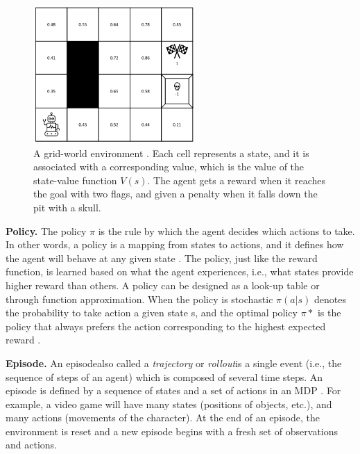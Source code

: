 \begin{figure}[!ht]
    \centering
    \includegraphics[width=0.55\textwidth]{images/gridworld.png}
    \caption{A grid-world environment \cite{eriksson2021deep}. Each cell represents a state, and it is associated with a corresponding value, which is the value of the state-value function $V(s)$. The agent gets a reward when it reaches the goal with two flags, and given a penalty when it falls down the pit with a skull.
    }
    \label{fig:gridworld}
\end{figure}



\textbf{Policy.}
The policy $\pi$ is the rule by which the agent decides which actions to take. In other words, a policy is a mapping from states to actions, and it defines how the agent will behave at any given state \cite{sutton2018reinforcement}.
The policy, just like the reward function, is learned based on what the agent experiences, i.e., what states provide higher reward than others. A policy can be designed as a look-up table or through function approximation. When the policy is stochastic $\pi(a|s)$ denotes the probability to take action a given state s, and the optimal policy $\pi*$ is the policy that always prefers the action corresponding to the highest expected reward \cite{sutton2018reinforcement}. 


\textbf{Episode.}
An episode\textemdash also called a \textit{trajectory} or \textit{rollout}\textemdash is a single event (i.e., the sequence of steps of an agent) which is composed of several time steps. An episode is defined by a sequence of states and a set of actions in an MDP \cite{sutton2018reinforcement}. For example, a video game will have many states (positions of objects, etc.), and many actions (movements of the character). 
At the end of an episode, the environment is reset and a new episode begins with a fresh set of observations and actions.

